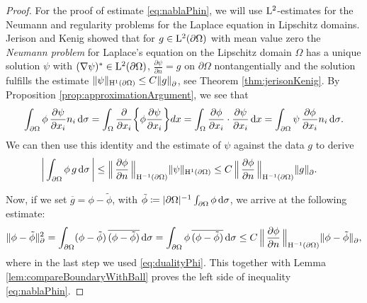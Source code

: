 \begin{proof}
  For the proof of estimate \eqref{eq:nablaPhin}, we will use $\mathrm{L}^2$-estimates for the Neumann and regularity problems for the Laplace equation in Lipschitz domains.
  Jerison and Kenig showed that for $g \in \mathrm{L}^2(\partial\Omega)$ with mean value zero the \emph{Neumann problem} for Laplace's equation on the Lipschitz domain $\Omega$ has a unique solution $\psi$ with  $(\nabla \psi)^* \in \mathrm{L}^2(\partial\Omega)$, $\frac{\partial \psi}{\partial n} = g$ on $\partial \Omega$ nontangentially and the solution fulfills the estimate $\|\psi\|_{\mathrm{H}^1(\partial\Omega)} \leq C \|g\|^{}_\partial$, see Theorem \ref{thm:jerisonKenig}.
  By Proposition \ref{prop:approximationArgument}, we see that
  \begin{align*}
    \int_{\partial\Omega} \phi \, \frac{\partial\psi}{\partial x_i} n_i \, {\operatorname{d}\!{\sigma}}  
    = \int_\Omega \frac{\partial}{\partial x_i} \bigg\{ \phi \frac{\partial\psi}{\partial x_i} \bigg\} d x 
    = \int_\Omega \frac{\partial \phi}{\partial x_i} \cdot \frac{\partial \psi}{\partial x_i} \, {\operatorname{d}\!{x}} 
    = \int_{\partial\Omega} \psi \, \frac{\partial \phi}{\partial x_i} n_i \, {\operatorname{d}\!{\sigma}}.
  \end{align*}
  We can then use this identity and the estimate of $\psi$ against the data $g$ to derive
  \begin{align}
    \label{eq:dualityPhi}
    \bigg| \int_{\partial\Omega} \phi \, g \, {\operatorname{d}\!{\sigma}}\, \bigg|
    &\leq \Big\|\, \frac{\partial \phi}{\partial n}\, \Big\|_{\mathrm{H}^{-1}(\partial\Omega)} \| \psi \|_{\mathrm{H}^1(\partial\Omega)} 
    \leq C\, \Big\|\, \frac{\partial \phi}{\partial n} \,\Big\|_{\mathrm{H}^{-1}(\partial\Omega)} \| g\|^{}_\partial.
  \end{align}
  
  Now, if we set $\overline g = \phi - \tilde \phi$, with $\tilde \phi \coloneqq |\partial \Omega|^{-1} \int_{\partial\Omega} \phi \, {\operatorname{d}\!{\sigma}}$, we arrive at the following estimate:
  \begin{align*}
      \| \phi - \tilde\phi \|_\partial^2
    = \int_{\partial\Omega} (\phi - \tilde \phi) \, \overline{(\phi - \tilde\phi)} \, {\operatorname{d}\!{\sigma}} 
    = \int_{\partial\Omega} \phi\, \overline{(\phi - \tilde\phi)} \, {\operatorname{d}\!{\sigma}} 
    \leq C\, \Big\|\, \frac{\partial\phi}{\partial n}\, \Big\|_{\mathrm{H}^{-1}(\partial\Omega)} \|\phi - \tilde \phi\|^{}_\partial,
  \end{align*}
  where in the last step we used \eqref{eq:dualityPhi}.
  This together with Lemma \ref{lem:compareBoundaryWithBall} proves the left side of inequality \eqref{eq:nablaPhin}.


\end{proof}
